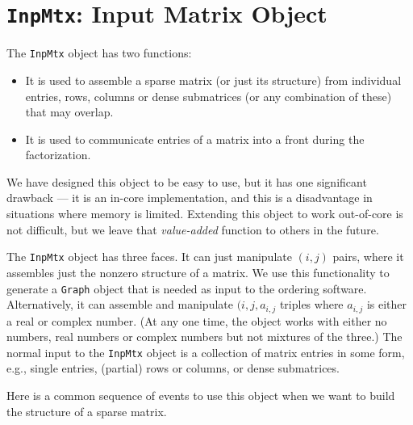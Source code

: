\chapter{{\tt InpMtx}: Input Matrix Object}
\label{chapter:InpMtx}
\par
The {\tt InpMtx} object has two functions:
\begin{itemize}
\item
It is used to assemble a sparse matrix (or just its structure)
from individual entries, rows, columns or dense submatrices 
(or any combination of these) that may overlap.
\item
It is used to communicate entries of a matrix into a front during
the factorization.
\end{itemize}
We have designed this object to be easy to use, but it has one
significant drawback --- it is an in-core implementation,
and this is a disadvantage in situations where memory is limited.
Extending this object to work out-of-core is not difficult,
but we leave that {\it value-added} function to others in the
future.
\par
The {\tt InpMtx} object has three faces.
It can just manipulate $(i,j)$ pairs, where it assembles just the
nonzero structure of a matrix.
We use this functionality to generate a {\tt Graph} object 
that is needed as input to the ordering software.
Alternatively, it can assemble and manipulate $(i,j,a_{i,j}$
triples where $a_{i,j}$ is either a real or complex number.
(At any one time, the object works with either no numbers, 
real numbers or complex numbers but not mixtures of the three.)
The normal input to the {\tt InpMtx} object is a collection of
matrix entries in some form, e.g., single entries, (partial) rows
or columns, or dense submatrices.
\par
Here is a common sequence of events to use this object when we want
to build the structure of a sparse matrix.
